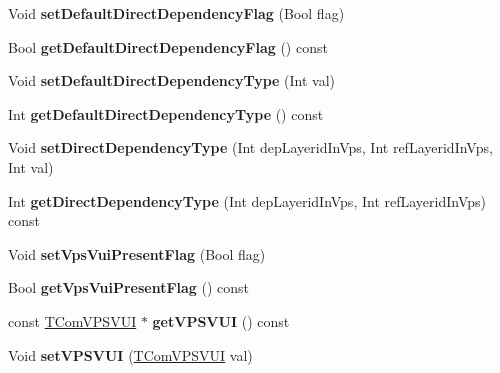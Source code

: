 \begin{DoxyCompactItemize}
Void {\bfseries set\+Default\+Direct\+Dependency\+Flag} (Bool flag)
\item 
\mbox{\label{class_t_com_v_p_s_a8392f09efb63edb22e354e382e9945ad}} 
Bool {\bfseries get\+Default\+Direct\+Dependency\+Flag} () const
\item 
\mbox{\label{class_t_com_v_p_s_acba5216d33a0e5fdfac6ba12d9d16c2c}} 
Void {\bfseries set\+Default\+Direct\+Dependency\+Type} (Int val)
\item 
\mbox{\label{class_t_com_v_p_s_a26ce7266def72a2f55d28aa0f453ab7b}} 
Int {\bfseries get\+Default\+Direct\+Dependency\+Type} () const
\item 
\mbox{\label{class_t_com_v_p_s_add1ba6da1969b72a01ad4a17bbd085b2}} 
Void {\bfseries set\+Direct\+Dependency\+Type} (Int dep\+Layerid\+In\+Vps, Int ref\+Layerid\+In\+Vps, Int val)
\item 
\mbox{\label{class_t_com_v_p_s_a7b83694e4a5fe552fcd61869d018b10b}} 
Int {\bfseries get\+Direct\+Dependency\+Type} (Int dep\+Layerid\+In\+Vps, Int ref\+Layerid\+In\+Vps) const
\item 
\mbox{\label{class_t_com_v_p_s_af14f34f478610ffd9eb48e86fe7483a6}} 
Void {\bfseries set\+Vps\+Vui\+Present\+Flag} (Bool flag)
\item 
\mbox{\label{class_t_com_v_p_s_a49ec562c7083e87fb80f47aba9b0d73c}} 
Bool {\bfseries get\+Vps\+Vui\+Present\+Flag} () const
\item 
\mbox{\label{class_t_com_v_p_s_ab01e27adebc63f22f1070eee1f00c5a2}} 
const \hyperlink{class_t_com_v_p_s_v_u_i}{T\+Com\+V\+P\+S\+V\+UI} $\ast$ {\bfseries get\+V\+P\+S\+V\+UI} () const
\item 
\mbox{\label{class_t_com_v_p_s_a480ae44e40848dbb4909eff33b6af11e}} 
Void {\bfseries set\+V\+P\+S\+V\+UI} (\hyperlink{class_t_com_v_p_s_v_u_i}{T\+Com\+V\+P\+S\+V\+UI} val)
\item 
\mbox{\label{class_t_com_v_p_s_a61ecb9a4ae341ed6713a3c7b44496b7f}} 

\end{DoxyCompactItemize}
